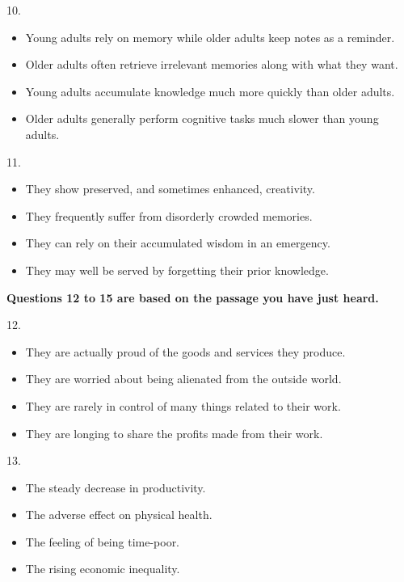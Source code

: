 \documentclass[UTF8,11pt]{ctexart}
\begin{document}
10.


\begin{itemize}[leftmargin=2em,itemsep=.2em,topsep=.4em]\item[A.] Young adults rely on memory while older adults keep notes as a reminder.
\item[B.] Older adults often retrieve irrelevant memories along with what they want.
\item[C.] Young adults accumulate knowledge much more quickly than older adults.
\item[D.] Older adults generally perform cognitive tasks much slower than young adults.
\end{itemize}

11.


\begin{itemize}[leftmargin=2em,itemsep=.2em,topsep=.4em]\item[A.] They show preserved, and sometimes enhanced, creativity.
\item[B.] They frequently suffer from disorderly crowded memories.
\item[C.] They can rely on their accumulated wisdom in an emergency.
\item[D.] They may well be served by forgetting their prior knowledge.
\end{itemize}

\textbf{Questions 12 to 15 are based on the passage you have just heard.}


12.


\begin{itemize}[leftmargin=2em,itemsep=.2em,topsep=.4em]\item[A.] They are actually proud of the goods and services they produce.
\item[B.] They are worried about being alienated from the outside world.
\item[C.] They are rarely in control of many things related to their work.
\item[D.] They are longing to share the profits made from their work.
\end{itemize}

13.


\begin{itemize}[leftmargin=2em,itemsep=.2em,topsep=.4em]\item[A.] The steady decrease in productivity.
\item[B.] The adverse effect on physical health.
\item[C.] The feeling of being time-poor.
\item[D.] The rising economic inequality.
\end{itemize}
\end{document}

